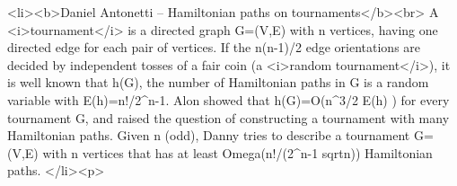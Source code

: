 <li><b>Daniel Antonetti -- Hamiltonian paths on tournaments</b><br>
A <i>tournament</i> is a directed graph G=(V,E) with n vertices,
having  one directed edge for each pair of vertices. If the n(n-1)/2
edge orientations are decided by independent tosses of a fair coin (a
<i>random tournament</i>), it is well known that h(G), the number of
Hamiltonian paths in G is a random variable with
E(h)=n!/2^{n-1}. Alon showed that
h(G)=O(n^{3/2} E(h) ) for every tournament G, and raised the question
of constructing a tournament with many Hamiltonian paths. 
Given n (odd), Danny tries to describe a tournament G=(V,E) with n vertices
that has at least Omega(n!/(2^{n-1} sqrt{n})) Hamiltonian paths.
</li><p>

 